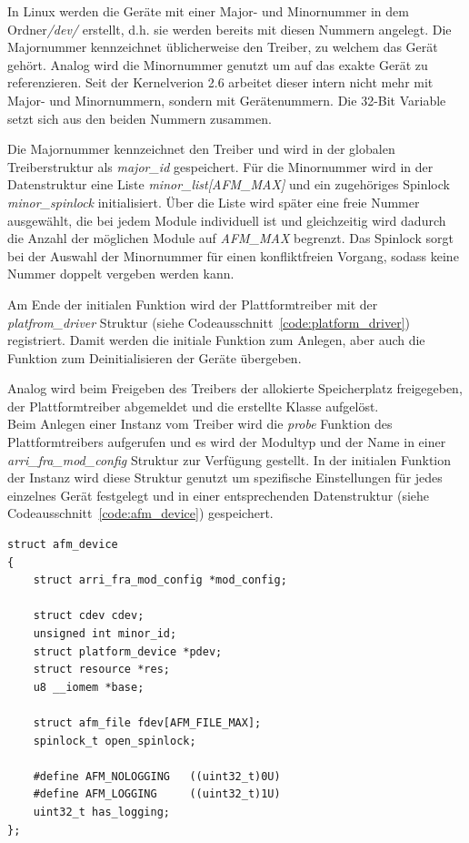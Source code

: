 In Linux werden die Geräte mit einer Major- und Minornummer in dem Ordner\textit{/dev/} erstellt, d.h. sie werden bereits mit diesen Nummern angelegt.
Die Majornummer kennzeichnet üblicherweise den Treiber, zu welchem das Gerät gehört. Analog wird die Minornummer genutzt um auf das exakte Gerät zu referenzieren. \citep[S. 43f.]{corbet2005linux} %
Seit der Kernelverion 2.6 arbeitet dieser intern nicht mehr mit Major- und Minornummern, sondern mit Gerätenummern. Die 32-Bit Variable setzt sich aus den beiden Nummern zusammen. \citep[Seite 244]{schroder2009embedded}%

Die Majornummer kennzeichnet den Treiber und wird in der globalen Treiberstruktur als \textit{major\_id} gespeichert. Für die Minornummer wird in der Datenstruktur eine Liste \textit{minor\_list[AFM\_MAX]} und ein zugehöriges Spinlock \textit{minor\_spinlock} initialisiert. Über die Liste wird später eine freie Nummer ausgewählt, die bei jedem Module individuell ist und gleichzeitig wird dadurch die Anzahl der möglichen Module auf \textit{AFM\_MAX} begrenzt. Das Spinlock sorgt bei der Auswahl der Minornummer für einen konfliktfreien Vorgang, sodass keine Nummer doppelt vergeben werden kann. 


Am Ende der initialen Funktion wird der Plattformtreiber mit der \textit{platfrom\_driver} Struktur (siehe Codeausschnitt~\ref{code:platform_driver}) registriert. Damit werden die initiale Funktion zum Anlegen, aber auch die Funktion zum Deinitialisieren der Geräte übergeben.


Analog wird beim Freigeben des Treibers der allokierte Speicherplatz freigegeben, der Plattformtreiber abgemeldet und die erstellte Klasse aufgelöst.\\


Beim Anlegen einer Instanz vom Treiber wird die \textit{probe} Funktion des Plattformtreibers aufgerufen und es wird der Modultyp und der Name in einer \textit{arri\_fra\_mod\_config} Struktur zur Verfügung gestellt. In der initialen Funktion der Instanz wird diese Struktur genutzt um spezifische Einstellungen für jedes einzelnes Gerät festgelegt und in einer entsprechenden Datenstruktur (siehe Codeausschnitt~\ref{code:afm_device}) gespeichert. 
\begin{lstfloat}
\begin{lstlisting}
struct afm_device 
{
	struct arri_fra_mod_config *mod_config;

	struct cdev cdev;
	unsigned int minor_id;
	struct platform_device *pdev;
	struct resource *res;
	u8 __iomem *base;
	
	struct afm_file fdev[AFM_FILE_MAX];
	spinlock_t open_spinlock;
	
	#define AFM_NOLOGGING   ((uint32_t)0U)
	#define AFM_LOGGING     ((uint32_t)1U)
	uint32_t has_logging;
};
\end{lstlisting}
\end{lstfloat}

